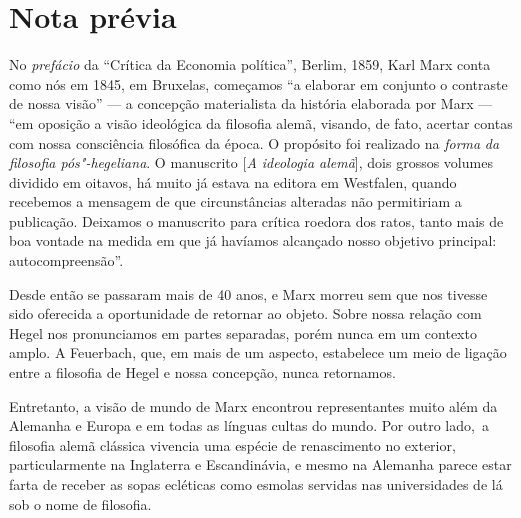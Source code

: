 {\let\clearpage\relax\chapter[Nota prévia]{Nota prévia\protect{}}}


\noindent{}No \emph{prefácio} da ``Crítica da Economia política'', Berlim, 1859,
Karl Marx conta como nós em 1845, em Bruxelas, começamos ``a elaborar em
conjunto o contraste de nossa visão'' --- a concepção materialista da
história elaborada por Marx --- ``em oposição a visão ideológica da
filosofia alemã, visando, de fato, acertar contas com nossa consciência
filosófica da época. O propósito foi realizado na \emph{forma} \emph{da
filosofia pós"-hegeliana}. O manuscrito {[}\emph{A ideologia alemã}{]},
dois grossos volumes dividido em oitavos, há muito já estava na editora
em Westfalen, quando recebemos a mensagem de que circunstâncias
alteradas não permitiriam a publicação. Deixamos o manuscrito para
crítica roedora dos ratos, tanto mais de boa vontade na medida em que já
havíamos alcançado nosso objetivo principal: autocompreensão''.

Desde então se passaram mais de 40 anos, e Marx morreu sem que nos
tivesse sido oferecida a oportunidade de retornar ao objeto. Sobre nossa
relação com Hegel nos pronunciamos em partes separadas, porém nunca em
um contexto amplo. A Feuerbach, que, em mais de um aspecto, estabelece
um meio de ligação entre a filosofia de Hegel e nossa concepção, nunca
retornamos.

Entretanto, a visão de mundo de Marx encontrou representantes muito além
da Alemanha e Europa e em todas as línguas cultas do mundo. Por outro
lado,\est\ a filosofia alemã clássica vivencia uma espécie de renascimento no
exterior, particularmente na Inglaterra e Escandinávia, e mesmo na
Alemanha parece estar farta de receber as sopas ecléticas como esmolas
servidas nas universidades de lá sob o nome de filosofia.

